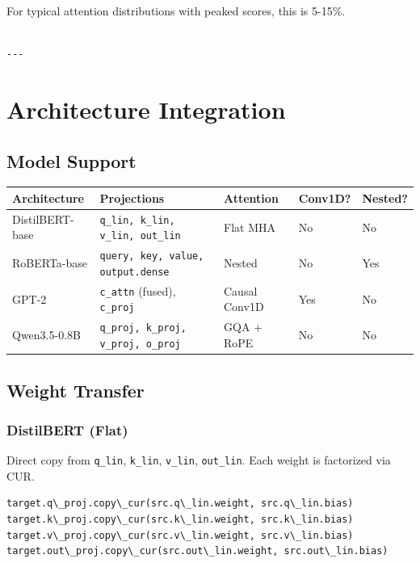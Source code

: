 For typical attention distributions with peaked scores, this is 5-15\%.
\begin{lstlisting}

---
\end{lstlisting}


\section{Architecture Integration}

\subsection{Model Support}

\begin{table}[H]
\centering
\small
\begin{tabular}{lllll}
\toprule
\textbf{Architecture} & \textbf{Projections} & \textbf{Attention} & \textbf{Conv1D?} & \textbf{Nested?} \\
\midrule
DistilBERT-base & \texttt{q\_lin, k\_lin, v\_lin, out\_lin} & Flat MHA & No & No \\
RoBERTa-base & \texttt{query, key, value, output.dense} & Nested & No & Yes \\
GPT-2 & \texttt{c\_attn} (fused), \texttt{c\_proj} & Causal Conv1D & Yes & No \\
Qwen3.5-0.8B & \texttt{q\_proj, k\_proj, v\_proj, o\_proj} & GQA + RoPE & No & No \\
\bottomrule
\end{tabular}
\end{table}

\subsection{Weight Transfer}

\subsubsection{DistilBERT (Flat)}

Direct copy from \texttt{q\_lin}, \texttt{k\_lin}, \texttt{v\_lin}, \texttt{out\_lin}. Each weight is 
factorized via CUR.

\begin{lstlisting}
target.q\_proj.copy\_cur(src.q\_lin.weight, src.q\_lin.bias)
target.k\_proj.copy\_cur(src.k\_lin.weight, src.k\_lin.bias)
target.v\_proj.copy\_cur(src.v\_lin.weight, src.v\_lin.bias)
target.out\_proj.copy\_cur(src.out\_lin.weight, src.out\_lin.bias)
\end{lstlisting}

